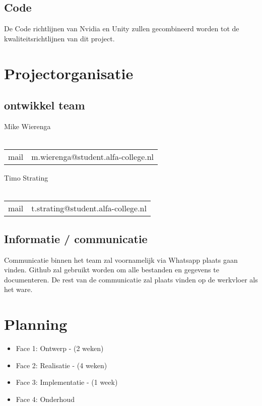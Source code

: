 \documentclass[]{report}
\begin{document}
\section{Code}		
De Code richtlijnen van Nvidia en Unity zullen gecombineerd worden tot de kwaliteitsrichtlijnen van dit project.




\chapter{Projectorganisatie}

\section{ontwikkel team}
Mike Wierenga \\ \\
\begin{tabular}{ l c }
	mail & m.wierenga@student.alfa-college.nl  \\
\end{tabular}

\vspace*{25px}

Timo Strating \\ \\
\begin{tabular}{ l c }
	mail & t.strating@student.alfa-college.nl  \\
\end{tabular}

\vspace*{25px}


\section{Informatie / communicatie}

Communicatie binnen het team zal voornamelijk via Whatsapp plaats gaan vinden. Github zal gebruikt worden om alle bestanden en gegevens te documenteren. De rest van de communicatie zal plaats vinden op de werkvloer als het ware.



\chapter{Planning}

\begin{itemize}
	\item Face 1: Ontwerp - (2 weken)	
	\item Face 2: Realisatie - (4 weken)	
	\item Face 3: Implementatie  - (1 week)	
	\item Face 4: Onderhoud 
		\newline
\end{itemize} 
\end{document}
